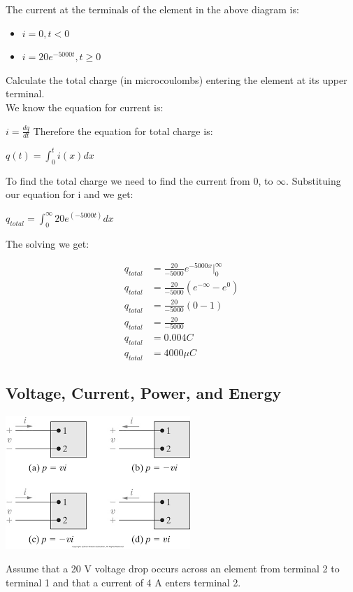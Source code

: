 The current at the terminals of the element in the above diagram is:

\begin{itemize}
	\item \( i = 0, t < 0 \)
	\item \( i = 20e^{-5000t}, t\geq0 \)
\end{itemize}

Calculate the total charge (in microcoulombs) entering the element at its upper terminal.
\\ We know the equation for current is:

\( i = \frac{dq}{dt} \)
Therefore the equation for total charge is:

\( q(t) =  \int_{0}^{t}i(x)dx \)

To find the total charge we need to find the current from 0, to \( \infty \). Substituing our equation
for i and we get:

\(q_{total} = \int_{0}^{\infty}20e^{(-5000t)}dx \)

The solving we get:

\begin{align*}
	q_{total} &= \frac{20}{-5000}e^{-5000x} \Big|_{0}^{\infty}
	\\ q_{total} &= \frac{20}{-5000}\left(e^{-\infty} - e^{0}\right)
	\\ q_{total} &= \frac{20}{-5000}\left(0 - 1\right)
	\\ q_{total} &= \frac{20}{-5000}
	\\ q_{total} &= 0.004 C
	\\ q_{total} &= 4000 \mu C
\end{align*}
 
\newpage
\subsection{Voltage, Current, Power, and Energy}
\includegraphics{img/c1/power}

Assume that a 20 V voltage drop occurs across an element from terminal 2 to terminal 1 and
that a current of 4 A enters terminal 2.

